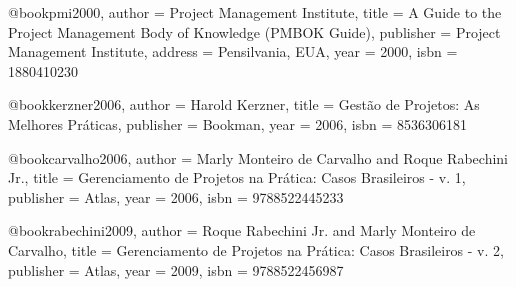 @book{pmi2000,
  author = {{Project Management Institute}},
  title = {A Guide to the Project Management Body of Knowledge (PMBOK Guide)},
  publisher = {Project Management Institute},
  address = {Pensilvania, EUA},
  year = {2000},
  isbn = {1880410230}
}

@book{kerzner2006,
  author = {Harold Kerzner},
  title = {Gestão de Projetos: As Melhores Práticas},
  publisher = {Bookman},
  year = {2006},
  isbn = {8536306181}
}

@book{carvalho2006,
  author = {Marly Monteiro de Carvalho and Roque Rabechini Jr.},
  title = {Gerenciamento de Projetos na Prática: Casos Brasileiros - v. 1},
  publisher = {Atlas},
  year = {2006},
  isbn = {9788522445233}
}

@book{rabechini2009,
  author = {Roque Rabechini Jr. and Marly Monteiro de Carvalho},
  title = {Gerenciamento de Projetos na Prática: Casos Brasileiros - v. 2},
  publisher = {Atlas},
  year = {2009},
  isbn = {9788522456987}
}

%
